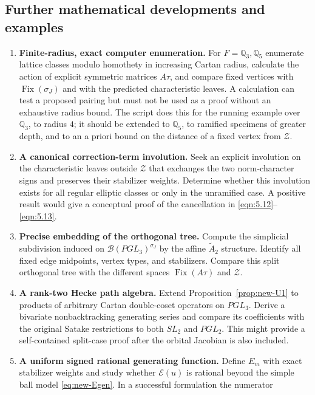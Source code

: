 \documentclass[12pt,letterpaper]{amsart}
\numberwithin{equation}{section}
\theoremstyle{definition}
\theoremstyle{plain}
\begin{document}
\subsection{Further mathematical developments and examples}
\begin{enumerate}
\item\textbf{Finite-radius, exact computer enumeration.}
For $F=\mathbb Q_3,\mathbb Q_5$ enumerate lattice classes modulo
homothety in increasing Cartan radius, calculate the action of
explicit symmetric matrices $A\tau$, and compare fixed vertices
with $\operatorname{Fix}(\sigma_J)$ and with the predicted
characteristic leaves. A calculation can test a proposed pairing
but must not be used as a proof without an exhaustive radius bound.
The script  does this for
the running example over $\mathbb Q_3$, to radius $4$; it should be
extended to $\mathbb Q_5$, to ramified specimens of greater depth, and
to an a priori bound on the distance of a fixed vertex from
$\mathcal Z$.
\item\textbf{A canonical correction-term involution.}
Seek an explicit involution on the characteristic leaves outside
$\mathcal Z$ that exchanges the two norm-character signs and
preserves their stabilizer weights. Determine whether this
involution exists for all regular elliptic classes or only in
the unramified case. A positive result would give a conceptual
proof of the cancellation in \eqref{eqn:5.12}--\eqref{eqn:5.13}.
\item\textbf{Precise embedding of the orthogonal tree.}
Compute the simplicial subdivision induced on
$\mathcal B(PGL_3)^{\sigma_J}$ by the affine $\widetilde A_2$
structure. Identify all fixed edge midpoints, vertex types, and
stabilizers. Compare this split orthogonal tree with the different
spaces $\operatorname{Fix}(A\tau)$ and $\mathcal Z$.
\item\textbf{A rank-two Hecke path algebra.}
Extend Proposition~\ref{prop:new-U1} to products of arbitrary
Cartan double-coset operators on $PGL_3$. Derive a bivariate
nonbacktracking generating series and compare its coefficients
with the original Satake restrictions to both $SL_2$ and $PGL_2$.
This might provide a self-contained split-case proof after the
orbital Jacobian is also included.
\item\textbf{A uniform signed rational generating function.}
Define $E_m$ with exact stabilizer weights and study whether
$\mathcal E(u)$ is rational beyond the simple ball model
\eqref{eq:new-Egen}. In a successful formulation the numerator

\end{enumerate}
\end{document}
